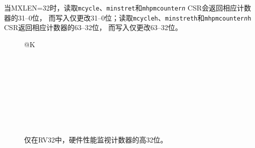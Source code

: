 当MXLEN=32时，读取{\tt mcycle}、{\tt minstret}和{\tt mhpmcounter{\em n}} CSR会返回相应计数器的31--0位，
而写入仅更改31--0位；读取{\tt mcycleh}、{\tt minstreth}和{\tt mhpmcounter{\em n}h} CSR返回相应计数器的63--32位，
而写入仅更改63--32位。

\begin{figure}[h!]
{\footnotesize
\begin{center}
\begin{tabular}{@{}K}
 \\ \hline
{} \\ \hline
{} \\ \hline
{} \\ \hline
{} \\ \hline
{}  \\ \hline
{} \\ \hline
{} \\  \\
\end{tabular}
\end{center}
}
\vspace{-0.1in}
\caption{仅在RV32中，硬件性能监视计数器的高32位。}
\end{figure}


